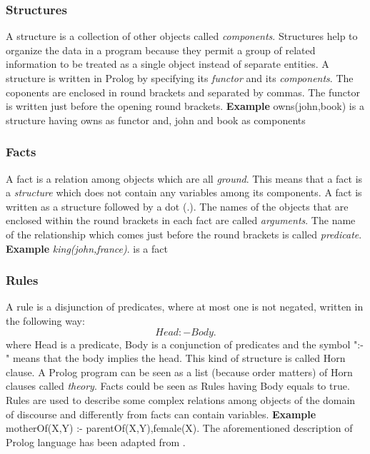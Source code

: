 \subsubsection{Structures}\label{subsubsec:structure}
A structure is a collection of other objects called \textit{components}. Structures help to organize the data in a program because
they permit a group of related information to be treated as a single object instead of separate entities.
A structure is written in Prolog by specifying its \textit{functor} and its \textit{components}. The coponents are enclosed in round brackets
and separated by commas. The functor is written just before the opening round brackets.\newline\newline
\textbf{Example}\newline\newline
owns(john,book) is a structure having owns as functor and, john and book as components
\subsubsection{Facts}\label{subsubsec:facts}
A fact is a relation among objects which are all \textit{ground}. This means that a fact is a \textit{structure} which does not contain any variables among its components.
A fact is written as a structure followed by a dot (.). The names of the objects that are enclosed within the round brackets in each fact are called \textit{arguments}.
The name of the relationship which comes just before the round brackets is called \textit{predicate}.\newline\newline
\textbf{Example}\newline\newline
\textit{king(john,france)}. is a fact

\subsubsection{Rules}\label{subsubsec:rules}
A rule is a disjunction of predicates, where at most one is not negated, written in the following way:
\[ Head :- Body.\]
where Head is a predicate, Body is a conjunction of predicates and the symbol ":-" means that the body implies the head. This kind of structure is called Horn clause.
A Prolog program can be seen as a list (because order matters) of Horn clauses called \textit{theory}.
Facts could be seen as Rules having Body equals to true.
Rules are used to describe some complex relations among objects of the domain of discourse and differently from facts can contain variables.\newline\newline
\textbf{Example}\label{subsubsec:rules}\newline\newline
motherOf(X,Y) :- parentOf(X,Y),female(X).\newline\newline
The aforementioned description of Prolog language has been adapted from \cite{Clocksin1987ProgrammingIP}.

